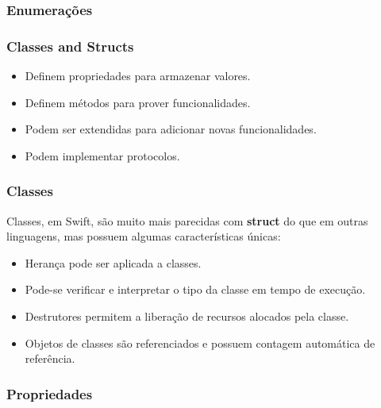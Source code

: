 \begin{frame}[fragile]
    \frametitle{Enumerações}

\end{frame}

\begin{frame}[fragile]
    \frametitle{Classes and Structs}

    \begin{itemize}
        \item Definem propriedades para armazenar valores.
        \item Definem métodos para prover funcionalidades.
        \item Podem ser extendidas para adicionar novas funcionalidades.
        \item Podem implementar protocolos.
    \end{itemize}
\end{frame}

\begin{frame}[fragile]
    \frametitle{Classes}

    Classes, em Swift, são muito mais parecidas com \textbf{struct} do
    que em outras linguagens, mas possuem algumas características únicas:

    \begin{itemize}
        \item Herança pode ser aplicada a classes.
        \item Pode-se verificar e interpretar o tipo da classe em tempo
        de execução.
        \item Destrutores permitem a liberação de recursos alocados pela
        classe.
        \item Objetos de classes são referenciados e possuem contagem
        automática de referência.
    \end{itemize}
\end{frame}

\begin{frame}[fragile]
    \frametitle{Propriedades}

\end{frame}

